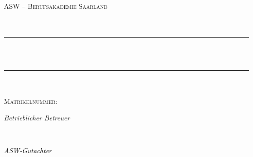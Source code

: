 \makeatletter
\begin{titlepage} 
	\newcommand{\HRule}{\rule{\linewidth}{0.5mm}}
	
	\center 
  \vspace*{1cm}
  
	
	\textsc{\LARGE ASW -- Berufsakademie Saarland}\\[1.5cm]
	
	\textsc{\Large \varArbeit}\\[0.5cm]
	
	\textsc{\large \varStudiengang}\\[0.5cm]
	
	
	\HRule\\[1cm]
	
	{\huge\bfseries\@title}\\[0.6cm]
	
	\HRule\\[1cm]
	

	\textsc{\Large \@author}\\[0.5cm]

	\textsc{\large Matrikelnummer: \varMartrikelnummer}\\[2cm]

	
	\begin{minipage}{0.43\textwidth}
		\begin{flushleft}
			\large
			\textit{Betrieblicher Betreuer}\\
			\varBetrBetreuer
		\end{flushleft}
	\end{minipage}
	~
	\begin{minipage}{0.43\textwidth}
		\begin{flushright}
			\large
			\textit{ASW-Gutachter}\\
			\varASWGutachter
		\end{flushright}
	\end{minipage}
	

\end{titlepage}
